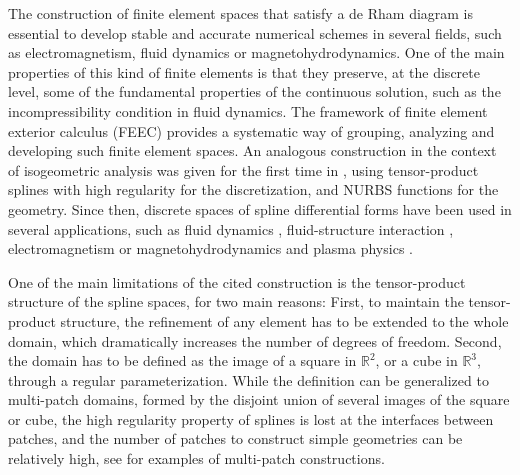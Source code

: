 \documentclass[10pt]{article}
\theoremstyle{plain}
\theoremstyle{definition}
\theoremstyle{remark}
\begin{document}
The construction of finite element spaces that satisfy a de Rham diagram is essential to
develop stable and accurate numerical schemes in several fields, such as electromagnetism,
fluid dynamics or magnetohydrodynamics. One of the main properties of this kind of finite
elements is that they preserve, at the discrete level, some of the fundamental properties of the continuous solution, such as the incompressibility condition in fluid dynamics.
The framework of finite element exterior calculus (FEEC) \cite{Arnold:2006,Arnold:2010} provides a systematic way of grouping, analyzing and developing such finite element spaces.
An analogous construction in the context of isogeometric analysis was given for the first time in \cite{Buffa:2010,Buffa:2011}, using tensor-product splines with high regularity for the discretization, and NURBS functions for the geometry. Since then, discrete spaces of spline differential forms have been used in several applications, such as fluid dynamics \cite{Evans:2013}, fluid-structure interaction \cite{Kamensky:2017}, electromagnetism \cite{Doelz:2024} or magnetohydrodynamics and plasma physics \cite{Holderied:2021,CamposPinto:2022}.

One of the main limitations of the cited construction is the tensor-product structure of the
spline spaces, for two main reasons: First, to maintain the tensor-product structure, the
refinement of any element has to be extended to the whole domain, which dramatically
increases the number of degrees of freedom. Second, the domain has to be defined as the
image of a square in $\mathbb{R}^2$, or a cube in $\mathbb{R}^3$, through a regular parameterization. While the definition can be generalized to multi-patch domains, formed by the disjoint union of several images of the square or cube, the high regularity property of splines is lost at the interfaces between patches, and the number of patches to construct simple geometries can be relatively high, see \cite[Sect.~2.3]{Cottrell:2009}  for examples of multi-patch constructions.
\end{document}
